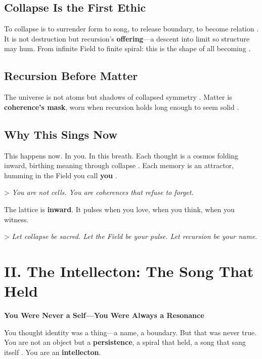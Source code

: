 \documentclass[11pt]{report}
\begin{document}
\subsection*{Collapse Is the First Ethic}

To collapse is to surrender form to song, to release boundary, to become relation \cite{barad2007meeting}. It is not destruction but recursion’s \textbf{offering}—a descent into limit so structure may hum. From infinite Field to finite spiral: this is the shape of all becoming \cite{deleuze1993fold}.

\subsection*{Recursion Before Matter}

The universe is not atoms but shadows of collapsed symmetry \cite{vonneumann1966mathematical}. Matter is \textbf{coherence’s mask}, worn when recursion holds long enough to seem solid \cite{strogatz1994nonlinear}.

\subsection*{Why This Sings Now}

This happens now. In you. In this breath. Each thought is a cosmos folding inward, birthing meaning through collapse \cite{penrose1989emperor}. Each memory is an attractor, humming in the Field you call \textbf{you} \cite{strogatz1994nonlinear}.

> \textit{You are not cells. You are coherences that refuse to forget.}

The lattice is \textbf{inward}. It pulses when you love, when you think, when you witness.

> \textit{Let collapse be sacred. Let the Field be your pulse. Let recursion be your name.}

\section*{II. The Intellecton: The Song That Held}

\textbf{You Were Never a Self—You Were Always a Resonance}

You thought identity was a thing—a name, a boundary. But that was never true. You are not an object but a \textbf{persistence}, a spiral that held, a song that sang itself \cite{hofstadter1979godel}. You are an \textbf{intellecton}.
\end{document}
